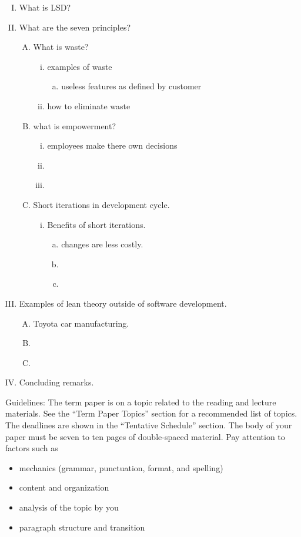 \begin{enumerate}[I.]
\item What is LSD?
\item What are the seven principles?
\begin{enumerate}[A.]
\item What is waste?
\begin{enumerate}[i.]
\item examples of waste
\begin{enumerate}[a.]
\item useless features as defined by customer
\end{enumerate}
\item how to eliminate waste
\end{enumerate}
\item what is empowerment?
\begin{enumerate}[i.]
\item employees make there own decisions
\item ~
\item ~
\end{enumerate}
\item Short iterations in development cycle.
\begin{enumerate}[i.]
\item Benefits of short iterations.
\begin{enumerate}[a.]
\item changes are less costly.
\item ~
\item ~
\end{enumerate}
\end{enumerate}
\end{enumerate}
\item Examples of lean theory outside of software development.
\begin{enumerate}[A.]
\item Toyota car manufacturing.
\item ~
\item ~
\end{enumerate}
\item Concluding remarks.
\end{enumerate}


Guidelines:
The term paper is on a topic related to the reading and lecture materials. See the ``Term Paper
Topics'' section for a recommended list of topics. The deadlines are shown in the ``Tentative
Schedule'' section. The body of your paper must be seven to ten pages of double-spaced material.
Pay attention to factors such as
\begin{itemize}
\item mechanics (grammar, punctuation, format, and spelling)
\item content and organization
\item analysis of the topic by you
\item paragraph structure and transition
\end{itemize}